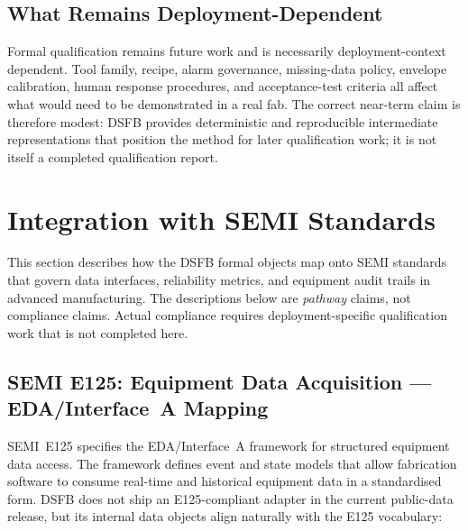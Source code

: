 \documentclass[11pt,letterpaper]{article}
\theoremstyle{scresult}
\begin{document}
\subsection{What Remains Deployment-Dependent}

Formal qualification remains future work and is necessarily deployment-context
dependent. Tool family, recipe, alarm governance, missing-data policy, envelope
calibration, human response procedures, and acceptance-test criteria all affect
what would need to be demonstrated in a real fab. The correct near-term claim is
therefore modest: DSFB provides deterministic and reproducible intermediate
representations that position the method for later qualification work; it is
not itself a completed qualification report.

\section{Integration with SEMI Standards}
\label{sec:semi-standards}

This section describes how the DSFB formal objects map onto SEMI standards that
govern data interfaces, reliability metrics, and equipment audit trails in
advanced manufacturing. The descriptions below are \emph{pathway} claims, not
compliance claims. Actual compliance requires deployment-specific qualification
work that is not completed here.

\subsection{SEMI E125: Equipment Data Acquisition --- EDA/Interface~A Mapping}

SEMI~E125 specifies the EDA/Interface~A framework for structured equipment data
access.  The framework defines event and state models that allow fabrication
software to consume real-time and historical equipment data in a standardised
form.  DSFB does not ship an E125-compliant adapter in the current public-data
release, but its internal data objects align naturally with the E125 vocabulary:
\end{document}

